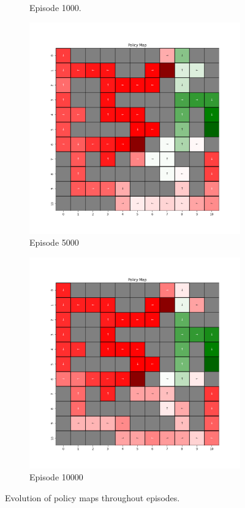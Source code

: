 \documentclass{assignment}
\begin{document}
\begin{figure}[H]
\begin{subfigure}{0.3\textwidth}
    \caption{Episode 1000.}
    \end{subfigure}\hfill
    \begin{subfigure}{0.3\textwidth}
        \includegraphics[width=\textwidth]{figures/policy_q/alpha_sweep/policy_alpha_1_gamma_0.95_epsilon_0.2_iteration_5000.png}
    \caption{Episode 5000}
    \end{subfigure}\hfill
    \begin{subfigure}{0.3\textwidth}
        \includegraphics[width=\textwidth]{figures/policy_q/alpha_sweep/policy_alpha_1_gamma_0.95_epsilon_0.2_iteration_10000.png}
    \caption{Episode 10000}
    \end{subfigure}
    \caption{Evolution of policy maps throughout episodes.}
    \label{fig:alpha_1_q_learning_policy}
\end{figure}
\end{document}
